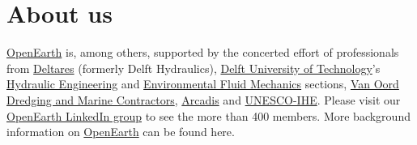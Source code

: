 \documentclass[a4paper, twocolumn, 12pt]{article}
\begin{document}
\section*{About us}
\href{http://www.openearth.eu}{OpenEarth} is, among others, supported by the concerted effort of professionals from \href{http://www.deltares.nl}{Deltares} (formerly Delft Hydraulics), \href{http://www.tudelft.nl}{Delft University of Technology}'s \href{http://www.waterbouw.tudelft.nl/}{Hydraulic Engineering} and \href{http://www.fluidmechanics.tudelft.nl/}{Environmental Fluid Mechanics} sections, \href{http://www.vanoord.com/}{Van Oord Dredging and Marine Contractors}, \href{http://www.arcadis.nl}{Arcadis} and \href{http://www.unesco-ihe.org/}{UNESCO-IHE}. Please visit our \href{https://www.linkedin.com/groups?home=&gid=3746269&trk=anet_ug_hm}{OpenEarth LinkedIn group} to see the more than 400 members. More background information on \href{http://www.openearth.eu}{OpenEarth} can be found here.
\end{document}
